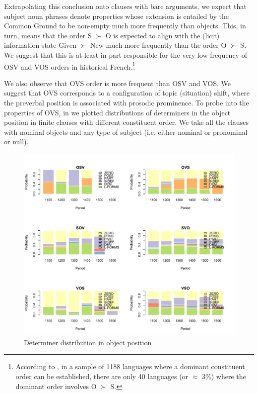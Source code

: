 \documentclass[output=paper,modfonts,nonflat]{langsci/langscibook}
\begin{document}
Extrapolating this conclusion onto clauses with bare arguments, we expect that subject noun phrases denote properties whose extension is entailed by the Common Ground to be non-empty much more frequently than objects. This, in turn, means that the order S $\succ$ O is expected to align with the (licit) information state Given $\succ$ New much more frequently than the order O $\succ$ S. We suggest that this is at least in part responsible for the very low frequency of OSV and VOS orders in historical French.\footnote{According to \citet{wals-81}, in a sample of 1188 languages where a dominant constituent order can be established, there are only 40 languages (or $\approx$ 3\%) where the dominant order involves O $\succ$ S.}

We also observe that OVS order is more frequent than OSV and VOS. We suggest that OVS corresponds to a configuration of topic (situation) shift, where the preverbal position is associated with prosodic prominence. To probe into the properties of OVS, in  we plotted distributions of determiners in the object position in finite clauses with different constituent order. We take all the clauses with nominal objects and any type of subject (i.e. either nominal or pronominal or null). 

\begin{figure}
\includegraphics[scale = 0.55]{figures/determinersOrders.pdf}
\caption{Determiner distribution in object position}\label{figure:determinersOrders}
\end{figure}
\end{document}
